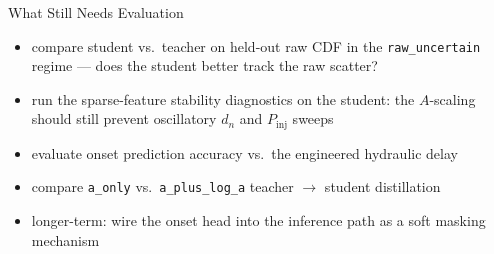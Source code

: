 \documentclass[UTF8,aspectratio=169]{ctexbeamer}
\begin{document}
\begin{frame}{What Still Needs Evaluation}
\begin{itemize}
  \item compare student vs.\ teacher on held-out raw CDF in the \texttt{raw\_uncertain} regime --- does the student better track the raw scatter?
  \item run the sparse-feature stability diagnostics on the student: the $A$-scaling should still prevent oscillatory $d_n$ and $P_{\mathrm{inj}}$ sweeps
  \item evaluate onset prediction accuracy vs.\ the engineered hydraulic delay
  \item compare \texttt{a\_only} vs.\ \texttt{a\_plus\_log\_a} teacher $\to$ student distillation
  \item longer-term: wire the onset head into the inference path as a soft masking mechanism
\end{itemize}
\end{frame}
\end{document}
